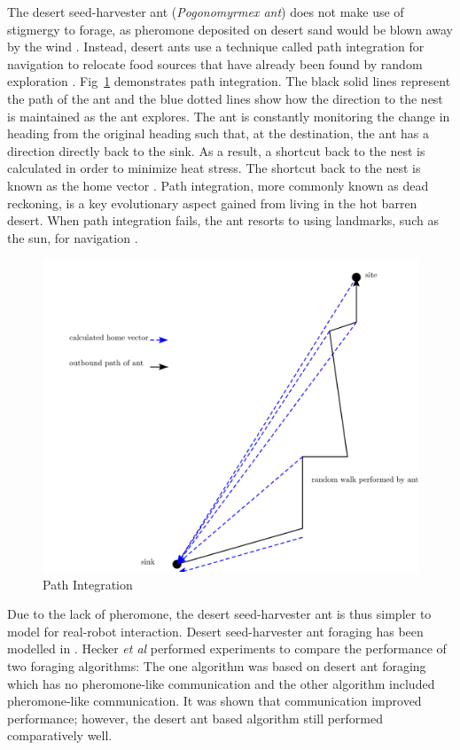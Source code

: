 The desert seed-harvester ant (\textit{Pogonomyrmex ant}) does not make use of stigmergy to forage, as pheromone deposited on desert sand would be blown away by the wind \cite{collett1992visual,hecker2015beyond}. Instead, desert ants use a technique called path integration for navigation to relocate food sources that have already been found by random exploration \cite{collett1998local,wehner2003desert}. Fig~\ref{pathintegration} demonstrates path integration. The black solid lines represent the path of the ant and the blue dotted lines show how the direction to the nest is maintained as the ant explores. The ant is constantly monitoring the change in heading from the original heading such that, at the destination, the ant has a direction directly back to the sink. As a result, a shortcut back to the nest is calculated in order to minimize heat stress. The shortcut back to the nest is known as the home vector \cite{muller1988path}. Path integration, more commonly known as dead reckoning, is a key evolutionary aspect gained from living in the hot barren desert. When path integration fails, the ant resorts to using landmarks, such as the sun, for navigation \cite{collett1998local}.

\begin{figure} [h]
	\centering
	\includegraphics[width=\textwidth]{chapters/chapter2/figures/drawing.png}
	\caption{Path Integration}
	\label{pathintegration}
\end{figure}

Due to the lack of pheromone, the desert seed-harvester ant is thus simpler to model for real-robot interaction. Desert seed-harvester ant foraging has been modelled in \cite{moller1998modeling,hecker2012formica}. Hecker \textit{et al} \cite{hecker2012formica} performed experiments to compare the performance of two foraging algorithms: The one algorithm was based on desert ant foraging which has no pheromone-like communication and the other algorithm included pheromone-like communication. It was shown that communication improved performance; however, the desert ant based algorithm still performed comparatively well. 

